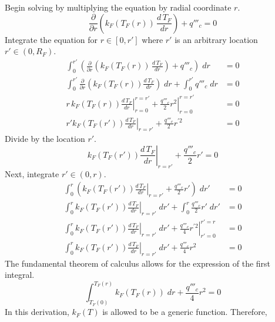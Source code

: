     Begin solving  by multiplying the
    equation by radial coordinate $r$.
    \begin{equation}
      \frac{\partial}{\partial r} \left( k_F(T_F(r)) \, \frac{d\, T_F}{dr} 
      \right) + q'''_c = 0
    \end{equation}
    Integrate the equation for $r \in [0,r']$ where $r'$ is an arbitrary
    location $r' \in (0,R_F)$.
    \begin{align}
      \int_0^{r'} \left( \frac{\partial}{\partial r} \left( k_F(T_F(r)) \, 
        \frac{d\, T_F}{dr} \right) + q'''_c \right) \; dr &= 0 \\
      \int_0^{r'} \frac{\partial}{\partial r} \left( k_F(T_F(r)) 
        \frac{d \, T_F}{dr} \right) \; dr + \int_0^{r'} q'''_c \; dr &= 0 \\
      \left. r \, k_F(T_F(r)) \frac{d\,T_F}{dr} \right|_{r=0}^{r=r'} + 
        \left. \frac{q'''_c}{2} r^2 \right|_{r=0}^{r=r'} &= 0 \\
      \left. r' k_F(T_F(r')) \frac{d\,T_F}{dr} \right|_{r=r'} + \frac{q'''_c}{2}
        r^{\prime 2} &= 0
    \end{align}
    Divide by the location $r'$.
    \begin{equation}
      \left. k_F(T_F(r')) \frac{d \, T_F}{dr}\right|_{r=r'} + 
        \frac{q'''_c}{2} r' = 0
    \end{equation}
    Next, integrate $r' \in (0,r)$.
    \begin{align}
      \int_0^r \left( k_F(T_F(r')) \left. \frac{d\,T_F}{dr}\right|_{r=r'} 
        + \frac{q'''_c}{2} r' \right) \; dr' &= 0 \\
      \int_0^r k_F(T_F(r')) \left. \frac{d\,T_F}{dr}\right|_{r=r'} \; dr' + 
        \int_0^r \frac{q'''_c}{2} r' \; dr' &= 0 \\
      \int_0^r k_F(T_F(r')) \left. \frac{d\,T_F}{dr}\right|_{r=r'} \; dr' + 
        \left. \frac{q'''_c}{4} r^{\prime 2} \right|_{r'=0}^{r'=r} &= 0 \\
      \int_0^r k_F(T_F(r')) \left. \frac{d\,T_F}{dr}\right|_{r=r'} \; dr' + 
        \frac{q'''_c}{4} r^2 &= 0
    \end{align}
    The fundamental theorem of calculus allows for the expression of the first
    integral.
    \begin{equation}
      \label{eq:tcl_integral}
      \int_{T_F(0)}^{T_F(r)} k_F(T_F(r)) \; dr + \frac{q'''_c}{4} r^2 = 0
    \end{equation}
    In this derivation, $k_F(T)$ is allowed to be a generic function. Therefore,
